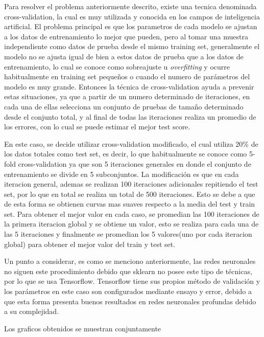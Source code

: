 Para resolver el problema anteriormente descrito, existe una tecnica denominada cross-validation, la cual es muy utilizada y conocida en los campos de inteligencia artificial. El problema principal es que los parametros de cada modelo se ajustan a los datos de entrenamiento lo mejor que pueden, pero al tomar una muestra independiente como datos de prueba desde el mismo training set, generalmente el modelo no se ajusta igual de bien a estos datos de prueba que a los datos de entrenamiento, lo cual se conoce como sobreajuste u \textit{overfitting} y ocurre habitualmente en training set pequeños o cuando el numero de parámetros del modelo es muy grande. Entonces la técnica de cross-validation ayuda a prevenir estas situaciones, ya que a partir de un numero determinado de iteraciones, en cada una de ellas selecciona un conjunto de pruebas de tamaño determinado desde el conjunto total, y al final de todas las iteraciones realiza un promedio de los errores, con lo cual se puede estimar el mejor test score.

En este caso, se decide utilizar cross-validation modificado, el cual utiliza $20\%$ de los datos totales como test set, es decir, lo que habitualmente se conoce como 5-fold cross-validation ya que son 5 iteraciones generales en donde el conjunto de entrenamiento se divide en 5 subconjuntos. La modificación es que en cada iteracion general, ademas se realizan 100 iteraciones adicionales repitiendo el test set, por lo que en total se realiza un total de 500 iteraciones. Esto se debe a que de esta forma se obtienen curvas mas suaves respecto a la media del test y train set. Para obtener el mejor valor en cada caso, se promedian las 100 iteraciones de la primera iteracion global y se obtiene un valor, esto se realiza para cada una de las 5 iteraciones y finalmente se promedian los 5 valores(uno por cada iteracion global) para obtener el mejor valor del train y test set.

Un punto a considerar, es como se menciono anteriormente, las redes neuronales no siguen este procedimiento debido que sklearn no posee este tipo de técnicas, por lo que se usa Tensorflow. Tensorflow tiene sus propios método de validación y los parámetros en este caso son configurados mediante ensayo y error, debido a que esta forma presenta buenos resultados en redes neuronales profundas debido a su complejidad.

Los graficos obtenidos se muestran conjuntamente

